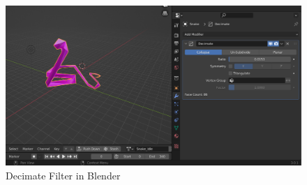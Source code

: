 \documentclass{article}
\begin{document}
    \begin{figure}
        \centering
        \includegraphics[width=\textwidth]{images/decimate.png}
        \caption{Decimate Filter in Blender} \label{fig:decimate}
    \end{figure}
\end{document}
